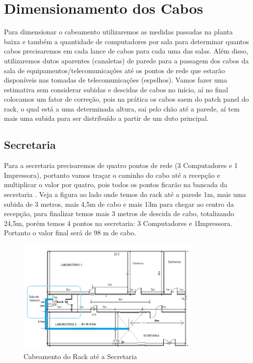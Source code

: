 \documentclass[	DIV=calc,%
							paper=a4,%
							fontsize=12pt,%
							onecolumn]{scrartcl}	 					%
\begin{document}
\section{Dimensionamento dos Cabos}
 
Para dimensionar o cabeamento utilizaremos  as medidas passadas na planta baixa e também a quantidade de computadores por sala para determinar quantos cabos precisaremos em cada lance de cabos para cada uma das salas.  Além disso,  utilizaremos dutos aparentes (canaletas) de parede para a passagem dos cabos da sala de equipamentos/telecomunicações até os pontos de rede que estarão disponíveis nas tomadas de telecomunicações (espelhos). 
Vamos fazer uma estimativa sem considerar subidas e descidas de cabos no início, aí no final colocamos um fator de correção, pois na prática os cabos saem do patch panel do rack, o qual está a uma determinada altura, sai pelo chão até a parede, aí tem mais uma subida para ser distribuído a partir de um duto principal. 

\subsection{Secretaria}
Para a secretaria precisaremos de quatro pontos de rede (3 Computadores e 1  Impressora), portanto vamos traçar o caminho do cabo até a recepção e multiplicar o valor por quatro, pois todos os pontos ficarão na bancada da secretaria . Veja a figura ao lado onde temos do rack até a parede 1m, mais uma subida de 3 metros, mais 4,5m de cabo e mais 13m para chegar ao centro da recepção, para finalizar temos mais 3 metros de descida de cabo, totalizando 24,5m, porém temos 4 pontos na secretaria: 3 Computadores e 1Impressora. Portanto o valor final será de 98 m de cabo.
\begin{figure}[H]
	\centering
	\includegraphics[width=0.8\textwidth]{fig7}
	\caption{Cabeamento do Rack até a Secretaria}
	\label{fig7}
\end{figure}
\end{document}
